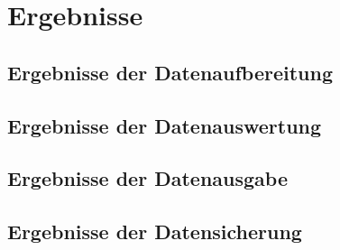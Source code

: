 \chapter{Ergebnisse}
\label{ch:results}

\blindtext

\section{Ergebnisse der Datenaufbereitung}
\label{sec:results:data_preparation}

\blindtext

\section{Ergebnisse der Datenauswertung}
\label{sec:results:data_analysis}

\blindtext

\section{Ergebnisse der Datenausgabe}
\label{sec:results:data_output}

\blindtext

\section{Ergebnisse der Datensicherung}
\label{sec:results:data_backup}

\blindtext